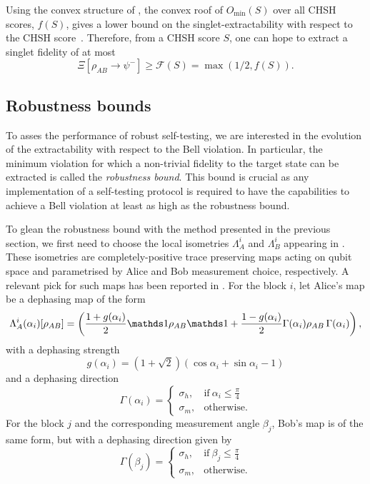 Using the convex structure of , the convex roof of $O_{\min}(S)$ over all CHSH scores, $f(S)$, gives a lower bound on the singlet-extractability with respect to the CHSH score~\cite{Sekatski2018}.
Therefore, from a CHSH score $S$, one can hope to extract a singlet fidelity of at most 
\begin{equation}
	\Xi [\rho_{AB} \rightarrow \psi^{-}] \geq \mathcal{F}(S)=\max\left(1/2, f(S)\right).
	\label{eq:}
\end{equation}

\subsection{Robustness bounds}

To asses the performance of robust self-testing, we are interested in the evolution of the extractability with respect to the Bell violation.
In particular, the minimum violation for which a non-trivial fidelity to the target state can be extracted is called the \textit{robustness bound}.
This bound is crucial as any implementation of a self-testing protocol is required to have the capabilities to achieve a Bell violation at least as high as the robustness bound.

To glean the robustness bound with the method presented in the previous section, we first need to choose the local isometries $\Lambda_A^i$ and $\Lambda_B^i$ appearing in .
These isometries are completely-positive trace preserving maps acting on qubit space and parametrised by Alice and Bob measurement choice, respectively.
A relevant pick for such maps has been reported in \cite{Kaniewski2016}.
For the block $i$, let Alice's map be a dephasing map of the form
\begin{equation}
	\Lambda_A^i(\alpha_i)[\rho_{AB}] = \left( \frac{1+g(\alpha_i)}{2}\id\rho_{AB}\id+\frac{1-g(\alpha_i)}{2}\Gamma(\alpha_i)\rho_{AB}\,\Gamma(\alpha_i)\right),
	\label{eq:dephasing_maps}
\end{equation}
with a dephasing strength
\begin{equation}
	g(\alpha_i)=(1+\sqrt{2})(\cos{\alpha_i}+\sin{\alpha_i}-1)
	\label{eq:dephasing_strength}
\end{equation}
and a dephasing direction
\begin{equation}
	\Gamma(\alpha_i) = \begin{cases}
      \sigma_h, & \text{if}\ \alpha_i\leq\frac{\pi}{4} \\
      \sigma_m, & \text{otherwise}.
    \end{cases}
	\label{eq:dephasing_direction_alice}
\end{equation}
For the block $j$ and the corresponding measurement angle $\beta_j$, Bob's map is of the same form, but with a dephasing direction given by
\begin{equation}
	\Gamma(\beta_j) = \begin{cases}
      \sigma_h, & \text{if}\ \beta_j\leq\frac{\pi}{4} \\
      \sigma_m, & \text{otherwise}.
    \end{cases}
	\label{eq:dephasing_direction_bob}
\end{equation}

